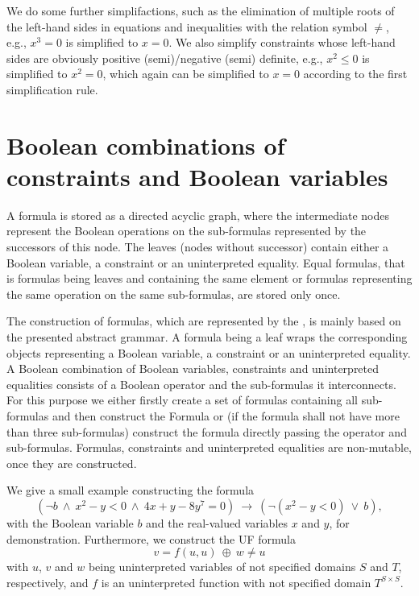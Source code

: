 We do some further simplifactions, such as the elimination of multiple roots of the left-hand sides in equations and inequalities with the relation symbol $\neq$, e.g., $x^3=0$ is simplified to $x=0$. We also simplify constraints whose left-hand sides are obviously positive (semi)/negative (semi) definite, e.g., $x^2\leq 0$ is simplified to $x^2=0$, which again can be simplified to $x=0$ according to the first simplification rule.

\section{Boolean combinations of constraints and Boolean variables}
A formula is stored as a directed acyclic graph, where the intermediate nodes represent the Boolean operations on the sub-formulas represented by the successors of this node. The leaves (nodes without successor) contain either a Boolean variable, a constraint or an uninterpreted equality. Equal formulas, that is formulas being leaves and containing the same element or formulas representing the same operation on the same sub-formulas, are stored only once.

The construction of formulas, which are represented by the \formulaClass, is mainly based on the presented abstract grammar. A formula being a leaf wraps the corresponding objects representing a Boolean variable, a constraint or an uninterpreted equality. A Boolean combination of Boolean variables, constraints and uninterpreted equalities consists of a Boolean operator and the sub-formulas it interconnects. For this purpose we either firstly create a set of formulas containing all sub-formulas and then construct the Formula or (if the formula shall not have more than three sub-formulas) construct the formula directly passing the operator and sub-formulas. Formulas, constraints and uninterpreted equalities are non-mutable, once they are constructed. %

We give a small example constructing the formula \[(\neg b\ \land\ x^2-y<0\ \land\ 4x+y-8y^7=0 )\ \rightarrow\ (\neg(x^2-y<0)\ \lor\ b ),\] with the Boolean variable $b$ and the real-valued variables $x$ and $y$, for demonstration. Furthermore, we construct the UF formula
\[v = f(u,u)\ \oplus\ w \neq u\]
with $u$, $v$ and $w$ being uninterpreted variables of not specified domains $S$ and $T$, respectively,
and $f$ is an uninterpreted function with not specified domain $T^{S\times S}$.

